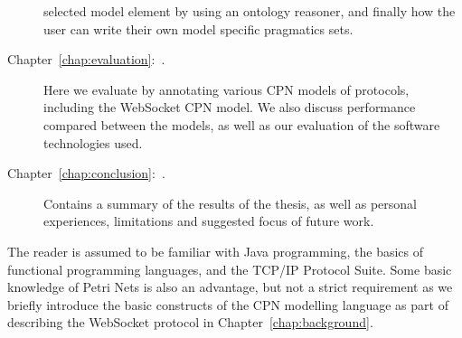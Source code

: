 \begin{description}
selected model element by using an ontology reasoner, and finally how the user
can write their own model specific pragmatics sets.
\item [Chapter~\ref{chap:evaluation}:~\nameref{chap:evaluation}.] Here we
evaluate \thename{} by annotating various CPN models of protocols, including
the WebSocket CPN model. We also discuss performance compared between the
models, as well as our evaluation of the software technologies used.
\item [Chapter~\ref{chap:conclusion}:~\nameref{chap:conclusion}.] Contains a
summary of the results of the thesis, as well as personal experiences,
limitations and suggested focus of future work.
\end{description} 


The reader is assumed to be familiar with Java programming, the basics of
functional programming languages, and the TCP/IP Protocol Suite. Some basic
knowledge of Petri Nets is also an advantage, but not a strict requirement as we
briefly introduce the basic constructs of the CPN modelling language as part of
describing the WebSocket protocol in Chapter~\ref{chap:background}.
